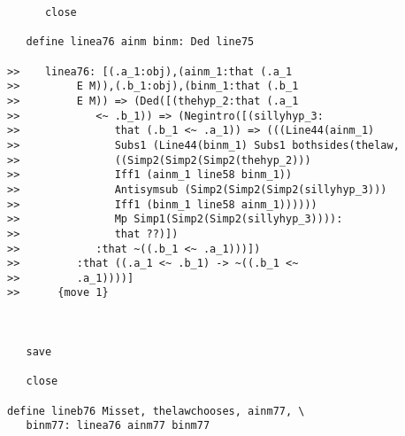 \documentclass[12pt]{article}
\begin{document}
\begin{verbatim}
      close

   define linea76 ainm binm: Ded line75

>>    linea76: [(.a_1:obj),(ainm_1:that (.a_1
>>         E M)),(.b_1:obj),(binm_1:that (.b_1
>>         E M)) => (Ded([(thehyp_2:that (.a_1
>>            <~ .b_1)) => (Negintro([(sillyhyp_3:
>>               that (.b_1 <~ .a_1)) => (((Line44(ainm_1)
>>               Subs1 (Line44(binm_1) Subs1 bothsides(thelaw,
>>               ((Simp2(Simp2(Simp2(thehyp_2)))
>>               Iff1 (ainm_1 line58 binm_1))
>>               Antisymsub (Simp2(Simp2(Simp2(sillyhyp_3)))
>>               Iff1 (binm_1 line58 ainm_1))))))
>>               Mp Simp1(Simp2(Simp2(sillyhyp_3)))):
>>               that ??)])
>>            :that ~((.b_1 <~ .a_1)))])
>>         :that ((.a_1 <~ .b_1) -> ~((.b_1 <~
>>         .a_1))))]
>>      {move 1}



   save

   close

define lineb76 Misset, thelawchooses, ainm77, \
   binm77: linea76 ainm77 binm77


\end{verbatim}
\end{document}
